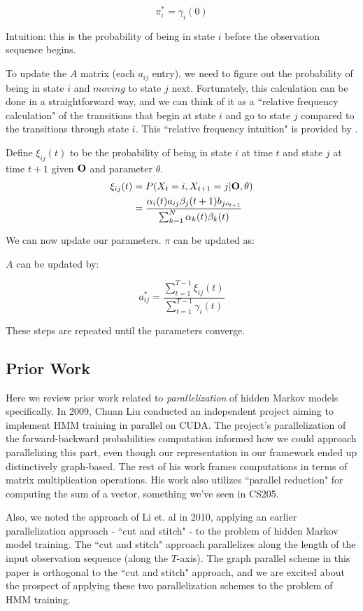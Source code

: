 \begin{equation}\label{pi}
\pi_i^* = \gamma_i(0)
\end{equation}

Intuition: this is the probability of being in state $i$ before the observation sequence begins.  

To update the $A$ matrix (each $a_{ij}$ entry), we need to figure  out the probability of being in state $i$ and $\textit{moving}$ to state $j$ next.  Fortunately, this calculation can be done in a straightforward way, and we can think of it as a ``relative frequency calculation" of the transitions that begin at state $i$ and go to state $j$ compared to the transitions through state $i$.  This ``relative frequency intuition" is provided by \cite{rabiner1986introduction}.

Define $\xi_{ij}(t)$ to be the probability of being in state $i$ at time $t$ and state $j$ at time $t+1$ given $\bold{O}$ and parameter $\theta$. 
\begin{equation}\label{xi}
\begin{aligned}
\xi_{ij}(t) &= P(X_t = i, X_{t+1} = j | \bold{O}, \theta)  \\
&=\frac{\alpha_i(t) a_{ij} \beta_j(t+1)b_{jo_{t+1}}}{\sum_{k=1}^N \alpha_k(t) \beta_k(t)}
\end{aligned}
\end{equation}

We can now update our parameters. $\pi$ can be updated as:

$A$ can be updated by: 

\begin{equation}\label{a}
a^*_{ij} = \frac{\sum_{t=1}^{T-1}\xi_{ij}(t)}{\sum_{t=1}^{T-1}\gamma_i(t)}
\end{equation}

These steps are repeated until the parameters converge. 

\subsection{Prior Work}

Here we review prior work related to \textit{parallelization} of hidden Markov models specifically.  In 2009, Chuan Liu conducted an independent project aiming to implement HMM training in parallel on CUDA.  The project's parallelization of the  forward-backward probabilities computation informed how we could approach parallelizing this part, even though our representation in our framework ended up distinctively graph-based.  The rest of his work frames computations in terms of matrix multiplication operations.  His work also utilizes ``parallel reduction" for computing the sum of a vector, something we've seen in CS205.  \cite{cuda-hmm}

Also, we noted the approach of Li et. al in 2010, applying an earlier parallelization approach - ``cut and stitch" - to the problem of hidden Markov model training.  The ``cut and stitch" approach parallelizes along the length of the input observation sequence (along the $T$-axis).  The graph parallel scheme in this paper is orthogonal to the ``cut and stitch" approach, and we are excited about the prospect of applying these two parallelization schemes to the problem of HMM training. \cite{cut-stitch}